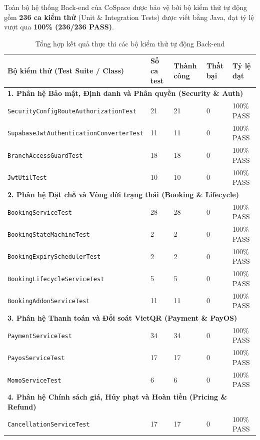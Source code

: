 Toàn bộ hệ thống Back-end của CoSpace được bảo vệ bởi bộ kiểm thử tự động gồm \textbf{236 ca kiểm thử} (Unit \& Integration Tests) được viết bằng Java, đạt tỷ lệ vượt qua \textbf{100\% (236/236 PASS)}. 

\begin{table}[H]
\centering
\caption{Tổng hợp kết quả thực thi các bộ kiểm thử tự động Back-end}
\label{tab:backend-test-summary}
\renewcommand{\arraystretch}{1.25}
\begin{tabular}{|p{5.5cm}|p{2.2cm}|p{2cm}|p{2cm}|p{2.5cm}|}
\hline
\textbf{Bộ kiểm thử (Test Suite / Class)} & \textbf{Số ca test} & \textbf{Thành công} & \textbf{Thất bại} & \textbf{Tỷ lệ đạt} \\
\hline
\multicolumn{5}{|l|}{\textbf{1. Phân hệ Bảo mật, Định danh và Phân quyền (Security \& Auth)}} \\
\hline
\texttt{SecurityConfigRouteAuthorizationTest} & 21 & 21 & 0 & 100\% PASS \\
\texttt{SupabaseJwtAuthenticationConverterTest} & 11 & 11 & 0 & 100\% PASS \\
\texttt{BranchAccessGuardTest} & 18 & 18 & 0 & 100\% PASS \\
\texttt{JwtUtilTest} & 10 & 10 & 0 & 100\% PASS \\
\hline
\multicolumn{5}{|l|}{\textbf{2. Phân hệ Đặt chỗ và Vòng đời trạng thái (Booking \& Lifecycle)}} \\
\hline
\texttt{BookingServiceTest} & 28 & 28 & 0 & 100\% PASS \\
\texttt{BookingStateMachineTest} & 2 & 2 & 0 & 100\% PASS \\
\texttt{BookingExpirySchedulerTest} & 2 & 2 & 0 & 100\% PASS \\
\texttt{BookingLifecycleServiceTest} & 5 & 5 & 0 & 100\% PASS \\
\texttt{BookingAddonServiceTest} & 11 & 11 & 0 & 100\% PASS \\
\hline
\multicolumn{5}{|l|}{\textbf{3. Phân hệ Thanh toán và Đối soát VietQR (Payment \& PayOS)}} \\
\hline
\texttt{PaymentServiceTest} & 34 & 34 & 0 & 100\% PASS \\
\texttt{PayosServiceTest} & 17 & 17 & 0 & 100\% PASS \\
\texttt{MomoServiceTest} & 6 & 6 & 0 & 100\% PASS \\
\hline
\multicolumn{5}{|l|}{\textbf{4. Phân hệ Chính sách giá, Hủy phạt và Hoàn tiền (Pricing \& Refund)}} \\
\hline
\texttt{CancellationServiceTest} & 17 & 17 & 0 & 100\% PASS \\

\end{tabular}
\end{table}
